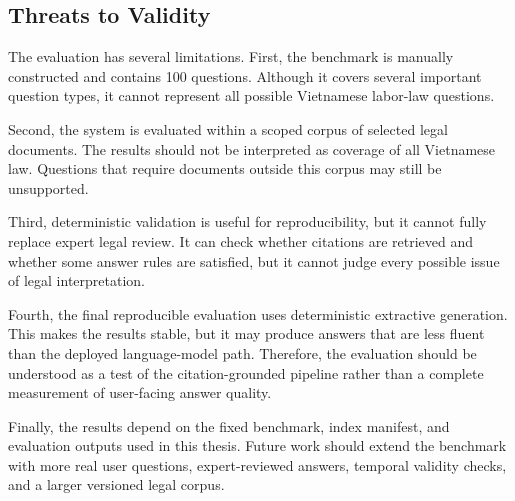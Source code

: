 \subsection{Threats to Validity}

The evaluation has several limitations. First, the benchmark is manually constructed and contains 100 questions. Although it covers several important question types, it cannot represent all possible Vietnamese labor-law questions.

Second, the system is evaluated within a scoped corpus of selected legal documents. The results should not be interpreted as coverage of all Vietnamese law. Questions that require documents outside this corpus may still be unsupported.

Third, deterministic validation is useful for reproducibility, but it cannot fully replace expert legal review. It can check whether citations are retrieved and whether some answer rules are satisfied, but it cannot judge every possible issue of legal interpretation.

Fourth, the final reproducible evaluation uses deterministic extractive generation. This makes the results stable, but it may produce answers that are less fluent than the deployed language-model path. Therefore, the evaluation should be understood as a test of the citation-grounded pipeline rather than a complete measurement of user-facing answer quality.

Finally, the results depend on the fixed benchmark, index manifest, and evaluation outputs used in this thesis. Future work should extend the benchmark with more real user questions, expert-reviewed answers, temporal validity checks, and a larger versioned legal corpus.
